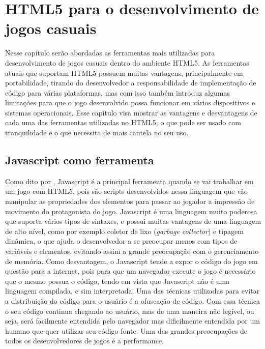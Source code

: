 \section{HTML5 para o desenvolvimento de jogos casuais}

Nesse capítulo serão abordadas as ferramentas mais utilizadas para
desenvolvimento de jogos casuais dentro do ambiente HTML5.
As ferramentas atuais que suportam HTML5 possuem muitas vantagens,
principalmente em portabilidade, tirando do desenvolvedor a
responsabilidade de implementação de código para várias plataformas, mas
com isso também introduz algumas limitações para que o jogo
desenvolvido possa funcionar em vários dispositivos e sistemas
operacionais. Esse capítulo visa mostrar as vantagens e desvantagens
de cada uma das ferramentas utilizadas no HTML5, o que pode ser usado
com tranquilidade e o que necessita de mais cautela no seu uso.

\subsection{Javascript como ferramenta}

Como dito por , Javascript é a principal ferramenta
quando se vai trabalhar em um jogo com HTML5, pois são scripts
desenvolvidos nessa linguagem que vão
manipular as propriedades dos elementos para passar ao jogador a
impressão de movimento do protagonista do jogo.
Javascript é uma linguagem muito poderosa que suporta vários tipos de
sintaxes, e possui muitas vantagens de uma linguagem de alto nível,
como por exemplo coletor de lixo (\textit{garbage collector}) e tipagem
dinâmica, o que ajuda o desenvolvedor a se preocupar menos com tipos
de variáveis e elementos, evitando assim a grande preocupação com o
gerenciamento de memória.
Como desvantagem, o Javascript tende a expor o código do jogo em
questão para a internet, pois para que um navegador execute o jogo é
necessário que o mesmo possua o código, tendo em vista que Javascript
não é uma linguagem compilada, e sim interpretada. Uma das técnicas
utilizadas para evitar a distribuição do código para o usuário é a
ofuscação de código. Com essa técnica o seu código continua chegando
ao usuário, mas de uma maneira não legível, ou seja, será facilmente
entendida pelo navegador mas dificilmente entendida por um humano que
quer utilizar seu código-fonte.
Uma das grandes preocupações de todos os desenvolvedores de jogos é a
performance.

